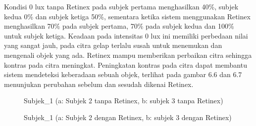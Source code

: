 Kondisi 0 lux  tanpa Retinex pada subjek pertama menghasilkan 40\%, subjek kedua 0\% dan subjek ketiga 50\%, sementara ketika sistem menggunakan Retinex menghasilkan 70\% pada subjek pertama, 70\% pada subjek kedua dan 100\% untuk subjek ketiga. Keadaan pada intensitas 0 lux ini memiliki perbedaan nilai yang sangat jauh, pada citra gelap terlalu susah untuk menemukan dan mengenali objek yang ada. Retinex mampu memberikan perbaikan citra sehingga kontras pada citra meningkat. Peningkatan kontras pada citra dapat membantu sistem mendeteksi keberadaan sebuah objek, terlihat pada gambar 6.6 dan 6.7 menunjukan perubahan sebelum dan sesudah dikenai Retinex.
\begin{figure}[H]
	\centering
	\caption{Subjek\_1 (a: Subjek 2 tanpa Retinex, b: subjek 3 tanpa Retinex)}
	\quad
	\caption{Subjek\_1 (a: Subjek 2 dengan Retinex, b: subjek 3 dengan Retinex)}
	\label{fig:example}%
\end{figure}
